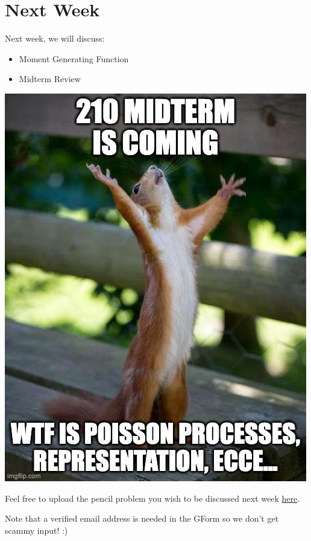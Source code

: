 \documentclass[
  letterpaper,
  DIV=11,
  numbers=noendperiod]{scrreprt}
\providecommand{\tightlist}{%
  \setlength{\itemsep}{0pt}\setlength{\parskip}{0pt}}\usepackage{longtable,booktabs,array}
\theoremstyle{plain}
\theoremstyle{definition}
\theoremstyle{remark}
\begin{document}
\hypertarget{next-week-4}{%
\section*{Next Week}\label{next-week-4}}


Next week, we will discuss:

\begin{itemize}
\tightlist
\item
  Moment Generating Function
\item
  Midterm Review
\end{itemize}

\includegraphics{./assets/img/midterm.jpeg}

Feel free to upload the pencil problem you wish to be discussed next
week \href{https://forms.gle/RBmMNYJp4u3qD5W79}{here}.

Note that a verified email address is needed in the GForm so we don't
get scammy input! :)
\end{document}
